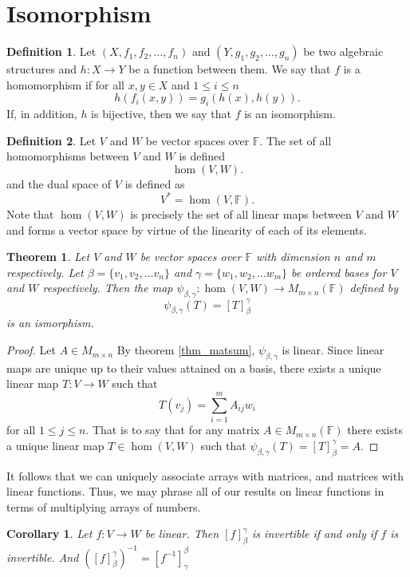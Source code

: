 \documentclass[oneside, 12pt]{book}
\newtheorem{thm}{Theorem}[section]
\newtheorem{cor}{Corollary}[section]
\theoremstyle{definition}
\newtheorem{defn}{Definition}[section]
\begin{document}
\section{Isomorphism}
\label{defn_hom}
\begin{defn}
Let $(X, f_{1}, f_{2}, \dots, f_{n})$ and $(Y, g_{1}, g_{2}, \dots, g_{n})$ be two algebraic structures and $h:X \to Y$ be a function between them. We say that $f$ is a homomorphism if for all $x,y\in X$ and $1 \leq i \leq n$  \[h(f_{i}(x,y))=g_{i}(h(x), h(y)).\] If, in addition, $h$ is bijective, then we say that $f$ is an isomorphism.
\end{defn}

\begin{defn}
  \label{defn_dual}
Let $V$ and $W$ be vector spaces over $\mathbb{F}$. The set of all homomorphisms between $V$ and $W$ is defined \[\hom(V, W).\] and the dual space of $V$ is defined as \[V^{*}=\hom(V, \mathbb{F}).\] Note that $\hom(V, W)$ is precisely the set of all linear maps between $V$ and $W$ and forms a vector space by virtue of the linearity of each of its elements.
\end{defn}
\begin{thm}
\label{thm_matiso}
Let $V$ and $W$ be vector spaces over $\mathbb{F}$ with dimension $n$ and $m$ respectively. Let $\beta=\{v_{1}, v_{2}, \dots v_{n}\}$ and $\gamma=\{w_{1},w_{2}, \dots w_{m}\}$ be ordered bases for $V$ and $W$ respectively. Then the map $\psi_{\beta,\gamma}: \hom(V, W) \to M_{m \times n}(\mathbb{F})$ defined by \[\psi_{\beta, \gamma}(T)=[T]_{\beta}^{\gamma}\] is an ismorphism.
\end{thm}
\begin{proof}
  Let $A \in M_{m \times n}$
  By theorem \ref{thm_matsum}, $\psi_{\beta,\gamma}$ is linear. Since linear maps are unique up to their values attained on a basis, there exists a unique linear map $T:V \to W$ such that \[T(v_{j})=\sum_{i=1}^{m}A_{ij}w_{i}\] for all $1 \leq j \leq n$. That is to say that for any matrix $A \in M_{m \times n}(\mathbb{F})$ there exists a unique linear map $T \in \hom(V,W)$ such that $\psi_{\beta,\gamma}(T)=[T]_{\beta}^{\gamma}=A$.
\end{proof}
It follows that we can uniquely associate arrays with matrices, and matrices with linear functions. Thus, we may phrase all of our results on linear functions in terms of multiplying arrays of numbers.
\begin{cor}
\label{thm_matinv}
Let $f: V \to W$ be linear. Then $[f]_{\beta}^{\gamma}$ is invertible if and only if $f$ is invertible. And $([f]_{\beta}^{\gamma})^{-1}=[f^{-1}]_{\gamma}^{\beta}$
\end{cor}
\end{document}
